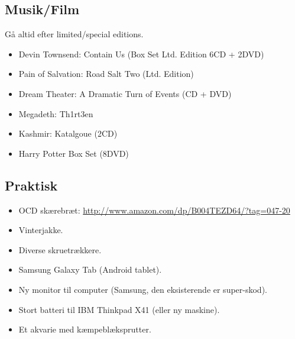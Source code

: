 \documentclass[a4paper, danish, 10pt, final]{article}
\begin{document}
\subsection*{Musik/Film}

Gå altid efter limited/special editions.
\begin{itemize}
    \item Devin Townsend: Contain Us (Box Set Ltd. Edition 6CD + 2DVD)
    \item Pain of Salvation: Road Salt Two (Ltd. Edition)
    \item Dream Theater: A Dramatic Turn of Events (CD + DVD)
    \item Megadeth: Th1rt3en
    \item Kashmir: Katalgoue (2CD)
    \item Harry Potter Box Set (8DVD)
\end{itemize}

\subsection*{Praktisk}
\begin{itemize}
    \item OCD skærebræt: \url{http://www.amazon.com/dp/B004TEZD64/?tag=047-20}
    \item Vinterjakke.
    \item Diverse skruetrækkere.
    \item Samsung Galaxy Tab (Android tablet).
    \item Ny monitor til computer (Samsung, den eksisterende er super-skod).
    \item Stort batteri til IBM Thinkpad X41 (eller ny maskine).
    \item Et akvarie med kæmpeblæksprutter.
\end{itemize}




\end{document}
